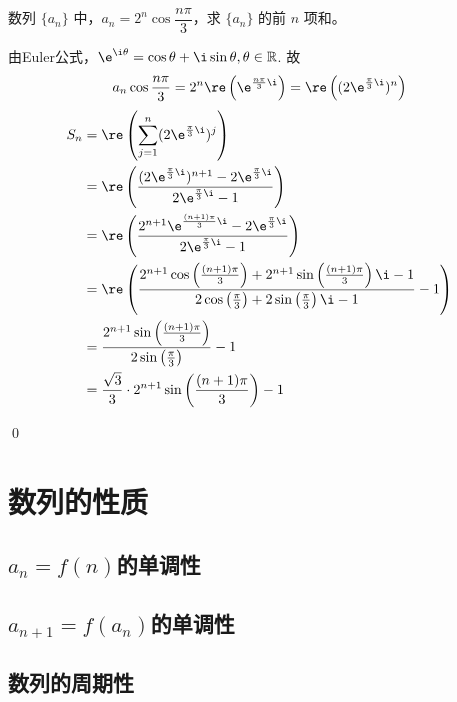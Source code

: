 \begin{example}
    数列 \(\{a_n\}\) 中，\(a_n = 2^n \cos \dfrac{n\pi}{3}\)，求 \(\{a_n\}\) 的前 \(n\) 项和。
\end{example}
\begin{jie}
    由Euler公式，\(\e^{\i\theta}=\cos \theta+\i\sin\theta,\theta\in\mathbb{R}\).
    故\[a_n \cos \frac{n\pi}{3} = 2^n \re\left(\e^{\frac{n\pi}{3}\i}\right) = \re\left((2\e^{\frac{\pi}{3}\i})^n\right) \]
    \begin{align*}
     S_n&= \re\left(\sum_{j=1}^{n} (2\e^{\frac{\pi}{3}\i})^j \right)  \\
        &= \re\left(\frac{(2\e^{\frac{\pi}{3}\i})^{n+1} - 2\e^{\frac{\pi}{3}\i}}{2\e^{\frac{\pi}{3}\i} - 1}\right) \\
        &= \re\left(\frac{2^{n+1} \e^{\frac{(n+1)\pi}{3}\i} - 2\e^{\frac{\pi}{3}\i}}{2\e^{\frac{\pi}{3}\i} - 1}\right) \\
        &= \re\left(\frac{2^{n+1} \cos\left(\frac{(n+1)\pi}{3}\right) + 2^{n+1} \sin\left(\frac{(n+1)\pi}{3}\right)\i - 1}{2\cos\left(\frac{\pi}{3}\right) + 2\sin\left(\frac{\pi}{3}\right)\i - 1} - 1\right) \\
        &= \frac{2^{n+1} \sin\left(\frac{(n+1)\pi}{3}\right)}{2\sin\left(\frac{\pi}{3}\right)} - 1 \\
        &= \frac{\sqrt{3}}{3} \cdot 2^{n+1} \sin\left(\frac{(n+1)\pi}{3}\right) - 1
        \end{align*}

    \qed



\end{jie}




\clearpage

\section{数列的性质}

\subsection{\texorpdfstring{$a_n=f(n)$}s的单调性}
\clearpage
\subsection{\texorpdfstring{$a_{n+1}=f(a_n)$}s的单调性}
\clearpage
\subsection{数列的周期性}
\clearpage

